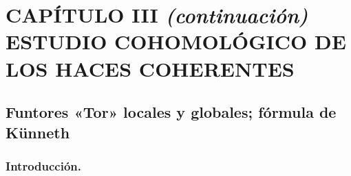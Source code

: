 \chapter*{CAPÍTULO III \emph{(continuación)}\\[1.2ex]
\Large ESTUDIO COHOMOLÓGICO DE LOS HACES COHERENTES}


\section{Funtores «Tor» locales y globales; fórmula de Künneth}
\label{section:III.6.fr}

\subsection{Introducción.}
\label{subsection:III.6.1.fr}


